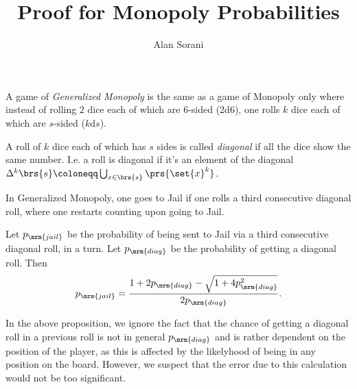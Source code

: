 \documentclass[10pt]{article}
\author{Alan Sorani}
\title{Proof for Monopoly Probabilities}
\begin{document}
\maketitle

\begin{definition}
A game of \emph{Generalized Monopoly} is the same as a game of Monopoly only where instead of rolling $2$ dice each of which are $6$-sided (2d6), one rolls $k$ dice each of which are $s$-sided ($k$d$s$).
\end{definition}

\begin{definition}
A roll of $k$ dice each of which has $s$ sides is called \emph{diagonal} if all the dice show the same number. I.e. a roll is diagonal if it's an element of the diagonal $\Delta^k \brs{s} \coloneqq \bigcup_{x \in \brs{s}} \prs{\set{x}^k}$.
\end{definition}

\begin{axiom}
In Generalized Monopoly, one goes to Jail if one rolls a third consecutive diagonal roll, where one restarts counting upon going to Jail.
\end{axiom}

\begin{proposition}
Let $p_{\mrm{jail}}$ be the probability of being sent to Jail via a third consecutive diagonal roll, in a turn. Let $p_{\mrm{diag}}$ be the probability of getting a diagonal roll. Then
\begin{align*}
p_{\mrm{jail}} = \frac{1 + 2 p_{\mrm{diag}} - \sqrt{1 + 4 p_{\mrm{diag}}^2}}{2 p_{\mrm{diag}}} \text{.}
\end{align*}
\end{proposition}

\begin{note}
In the above proposition, we ignore the fact that the chance of getting a diagonal roll in a previous roll is not in general $p_{\mrm{diag}}$ and is rather dependent on the position of the player, as this is affected by the likelyhood of being in any position on the board. However, we suspect that the error due to this calculation would not be too significant.
\end{note}
\end{document}
